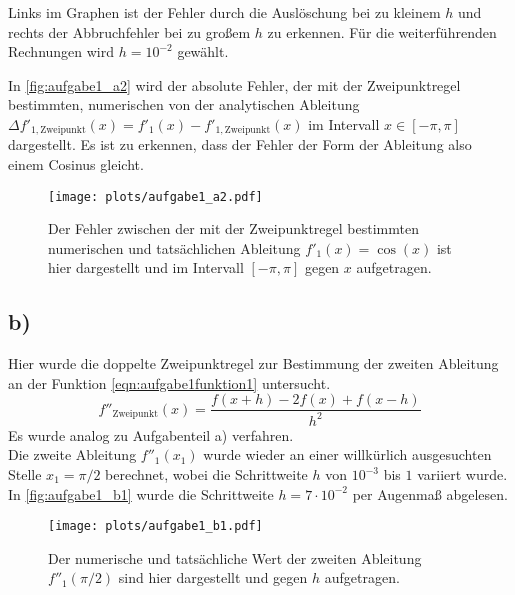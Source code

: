     Links im Graphen ist der Fehler durch die Auslöschung bei zu kleinem $h$ und rechts der Abbruchfehler bei zu großem $h$ zu erkennen.
    Für die weiterführenden Rechnungen wird $h = 10^{-2}$ gewählt.

    In \autoref{fig:aufgabe1_a2} wird der absolute Fehler, der mit der Zweipunktregel bestimmten, numerischen von der analytischen Ableitung $\Delta f'_{\mathrm{1,Zweipunkt}}(x) = f'_1(x) - f'_{\mathrm{1,Zweipunkt}}(x)$ im Intervall $x \in [-\pi, \pi]$ dargestellt.
    Es ist zu erkennen, dass der Fehler der Form der Ableitung also einem Cosinus gleicht.

    \begin{figure}[ht]
      \centering
      \texttt{[image: plots/aufgabe1\_a2.pdf]} \vspace*{-0.6cm}
      \caption{Der Fehler zwischen der mit der Zweipunktregel bestimmten numerischen und tatsächlichen Ableitung $f'_1(x) = \cos(x)$ ist hier dargestellt und im Intervall $[-\pi, \pi]$ gegen $x$ aufgetragen.}
      \label{fig:aufgabe1_a2}
    \end{figure}
    \FloatBarrier

  \subsection{b)}
    Hier wurde die doppelte Zweipunktregel zur Bestimmung der zweiten Ableitung an der Funktion \ref{eqn:aufgabe1funktion1} untersucht.
    \begin{equation}
      f''_{\mathrm{Zweipunkt}}(x) = \frac{f(x+h) - 2f(x) + f(x-h)}{h^2}
    \end{equation}
    Es wurde analog zu Aufgabenteil a) verfahren. \\
    Die zweite Ableitung $f''_1(x_1)$ wurde wieder an einer willkürlich ausgesuchten Stelle $x_1 = \pi / 2$ berechnet, wobei die Schrittweite $h$ von $10^{-3}$ bis $1$ variiert wurde.
    In \autoref{fig:aufgabe1_b1} wurde die Schrittweite $h = 7 \cdot 10^{-2}$ per Augenmaß abgelesen.
    
    \begin{figure}[H]
      \centering
      \texttt{[image: plots/aufgabe1\_b1.pdf]} \vspace*{-0.6cm}
      \caption{Der numerische und tatsächliche Wert der zweiten Ableitung $f''_1(\pi/2)$ sind hier dargestellt und gegen $h$ aufgetragen.}
      \label{fig:aufgabe1_b1}
    \end{figure}
    \FloatBarrier

